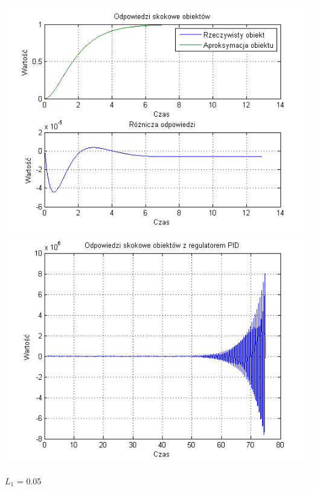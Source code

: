 \documentclass[10pt,a4paper]{article}
\begin{document}
\begin{center}
\includegraphics[scale=1]{images/dwa/skrypt_155.png}\\
\includegraphics[scale=1]{images/dwa/skrypt_156.png}\\
\end{center}
\newpage
$L_1$ = 0.05
\end{document}
